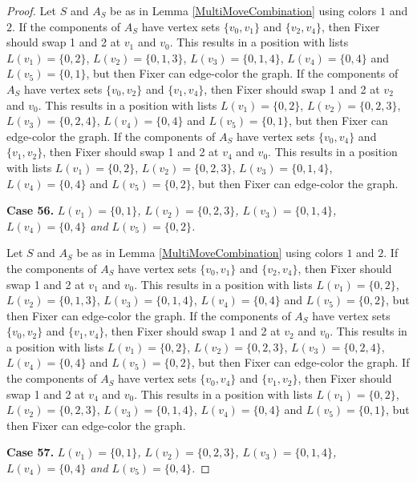 \documentclass[12pt]{amsart}
\theoremstyle{plain}
\theoremstyle{definition}
\theoremstyle{remark}
\begin{document}
\begin{proof}
Let $S$ and $A_S$ be as in Lemma \ref{MultiMoveCombination} using colors $1$ and $2$. If the components of $A_S$ have vertex sets $\{v_0, v_1\}$ and $\{v_2, v_4\}$, then Fixer should swap 1 and 2 at $v_1$ and $v_0$. This results in a position with lists $L(v_1) = \{0, 2\}$, $L(v_2) = \{0, 1, 3\}$, $L(v_3) = \{0, 1, 4\}$, $L(v_4) = \{0, 4\}$ and $L(v_5) = \{0, 1\}$, but then Fixer can edge-color the graph.
If the components of $A_S$ have vertex sets $\{v_0, v_2\}$ and $\{v_1, v_4\}$, then Fixer should swap 1 and 2 at $v_2$ and $v_0$. This results in a position with lists $L(v_1) = \{0, 2\}$, $L(v_2) = \{0, 2, 3\}$, $L(v_3) = \{0, 2, 4\}$, $L(v_4) = \{0, 4\}$ and $L(v_5) = \{0, 1\}$, but then Fixer can edge-color the graph.
If the components of $A_S$ have vertex sets $\{v_0, v_4\}$ and $\{v_1, v_2\}$, then Fixer should swap 1 and 2 at $v_4$ and $v_0$. This results in a position with lists $L(v_1) = \{0, 2\}$, $L(v_2) = \{0, 2, 3\}$, $L(v_3) = \{0, 1, 4\}$, $L(v_4) = \{0, 4\}$ and $L(v_5) = \{0, 2\}$, but then Fixer can edge-color the graph.

\noindent\textbf{Case 56.  }\textit{$L(v_1) = \{0, 1\}$, $L(v_2) = \{0, 2, 3\}$, $L(v_3) = \{0, 1, 4\}$, $L(v_4) = \{0, 4\}$ and $L(v_5) = \{0, 2\}$.}

Let $S$ and $A_S$ be as in Lemma \ref{MultiMoveCombination} using colors $1$ and $2$. If the components of $A_S$ have vertex sets $\{v_0, v_1\}$ and $\{v_2, v_4\}$, then Fixer should swap 1 and 2 at $v_1$ and $v_0$. This results in a position with lists $L(v_1) = \{0, 2\}$, $L(v_2) = \{0, 1, 3\}$, $L(v_3) = \{0, 1, 4\}$, $L(v_4) = \{0, 4\}$ and $L(v_5) = \{0, 2\}$, but then Fixer can edge-color the graph.
If the components of $A_S$ have vertex sets $\{v_0, v_2\}$ and $\{v_1, v_4\}$, then Fixer should swap 1 and 2 at $v_2$ and $v_0$. This results in a position with lists $L(v_1) = \{0, 2\}$, $L(v_2) = \{0, 2, 3\}$, $L(v_3) = \{0, 2, 4\}$, $L(v_4) = \{0, 4\}$ and $L(v_5) = \{0, 2\}$, but then Fixer can edge-color the graph.
If the components of $A_S$ have vertex sets $\{v_0, v_4\}$ and $\{v_1, v_2\}$, then Fixer should swap 1 and 2 at $v_4$ and $v_0$. This results in a position with lists $L(v_1) = \{0, 2\}$, $L(v_2) = \{0, 2, 3\}$, $L(v_3) = \{0, 1, 4\}$, $L(v_4) = \{0, 4\}$ and $L(v_5) = \{0, 1\}$, but then Fixer can edge-color the graph.

\noindent\textbf{Case 57.  }\textit{$L(v_1) = \{0, 1\}$, $L(v_2) = \{0, 2, 3\}$, $L(v_3) = \{0, 1, 4\}$, $L(v_4) = \{0, 4\}$ and $L(v_5) = \{0, 4\}$.}


\end{proof}
\end{document}
